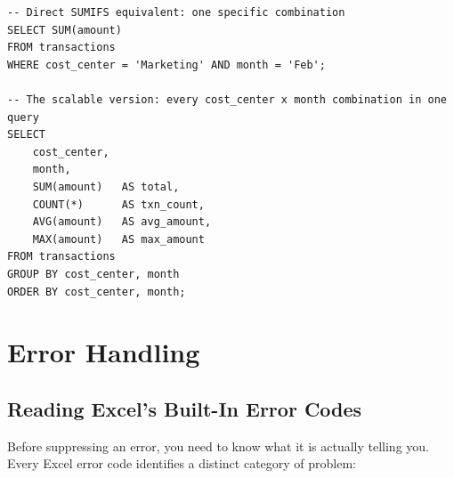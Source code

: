 \documentclass[11pt,a4paper]{article}
\begin{document}
\begin{lstlisting}[style=sqlstyle, caption={The native version: WHERE for a single SUMIF, GROUP BY for every combination at once}]
-- Direct SUMIFS equivalent: one specific combination
SELECT SUM(amount)
FROM transactions
WHERE cost_center = 'Marketing' AND month = 'Feb';

-- The scalable version: every cost_center x month combination in one query
SELECT
    cost_center,
    month,
    SUM(amount)   AS total,
    COUNT(*)      AS txn_count,
    AVG(amount)   AS avg_amount,
    MAX(amount)   AS max_amount
FROM transactions
GROUP BY cost_center, month
ORDER BY cost_center, month;
\end{lstlisting}

\section{Error Handling}
\label{sec:errorhandling}

\subsection{Reading Excel's Built-In Error Codes}

Before suppressing an error, you need to know what it is actually telling you. Every Excel error code identifies a distinct category of problem:
\end{document}
